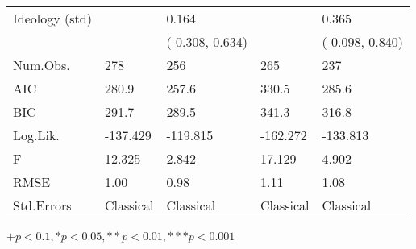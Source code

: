 \begin{table}[th!]
\begin{threeparttable}
\begin{tabular}{lC{2.7cm}C{2.7cm}C{2.7cm}C{2.7cm}}
 Ideology (std) &                  &                   0.164 &                  &                    0.365 \\
                &                  &         (-0.308, 0.634) &                  &          (-0.098, 0.840) \\
       Num.Obs. &              278 &                     256 &              265 &                      237 \\
            AIC &            280.9 &                   257.6 &            330.5 &                    285.6 \\
            BIC &            291.7 &                   289.5 &            341.3 &                    316.8 \\
       Log.Lik. &         -137.429 &                -119.815 &         -162.272 &                 -133.813 \\
              F &           12.325 &                   2.842 &           17.129 &                    4.902 \\
           RMSE &             1.00 &                    0.98 &             1.11 &                     1.08 \\
     Std.Errors &        Classical &               Classical &        Classical &                Classical \\
\bottomrule
\end{tabular}
\begin{tablenotes}
\item \footnotesize $+ p < 0.1, * p < 0.05, ** p < 0.01, *** p < 0.001$
\end{tablenotes}
\end{threeparttable}
\end{table}
